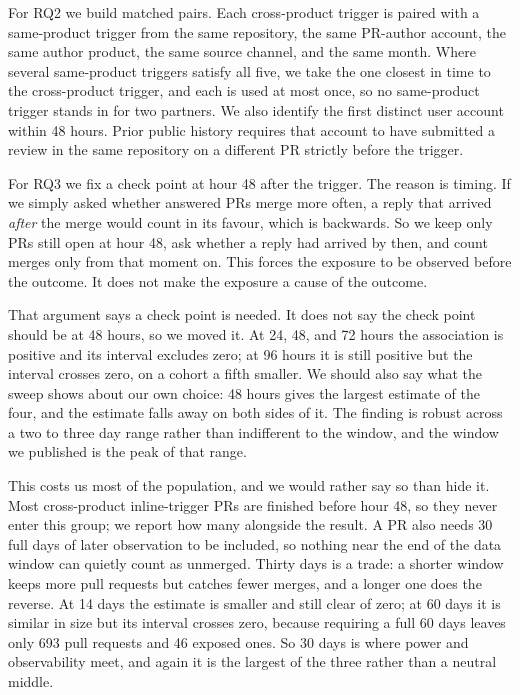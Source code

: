 \documentclass[lineno,pdflatex,sn-basic]{sn-jnl}
\begin{document}
For RQ2 we build matched pairs. Each cross-product trigger is paired with a
same-product trigger from the same repository, the same PR-author account, the
same author product, the same source channel, and the same month. Where several same-product triggers satisfy all
five, we take the one closest in time to the cross-product trigger, and each is
used at most once, so no same-product trigger stands in for two partners.
We also identify the first distinct user account within 48 hours. Prior public
history requires that account to have submitted a review in the same repository
on a different PR strictly before the trigger.

For RQ3 we fix a check point at hour 48 after the trigger. The reason is timing.
If we simply asked whether answered PRs merge more often, a reply that arrived
\emph{after} the merge would count in its favour, which is backwards. So we keep
only PRs still open at hour 48, ask whether a reply had arrived by then, and count
merges only from that moment on. This forces the exposure to be observed before the
outcome. It does not make the exposure a cause of the outcome.

That argument says a check point is needed. It does not say the check point
should be at 48 hours, so we moved it. At 24, 48, and 72 hours the association is
positive and its interval excludes zero; at 96 hours it is still positive but the
interval crosses zero, on a cohort a fifth smaller. We should also say what the
sweep shows about our own choice: 48 hours gives the largest estimate of the
four, and the estimate falls away on both sides of it. The finding is robust
across a two to three day range rather than indifferent to the window, and the
window we published is the peak of that range.

This costs us most of the population, and we would rather say so than hide it.
Most cross-product inline-trigger PRs are finished before hour 48, so they never
enter this group; we report how many alongside the result. A PR also needs 30 full
days of later observation to be included, so nothing near the end of the data
window can quietly count as unmerged. Thirty days is a trade: a shorter window
keeps more pull requests but catches fewer merges, and a longer one does the
reverse. At 14 days the estimate is smaller and still clear of zero; at 60 days
it is similar in size but its interval crosses zero, because requiring a full 60
days leaves only 693 pull requests and 46 exposed ones. So 30 days is where power
and observability meet, and again it is the largest of the three rather than a
neutral middle.
\end{document}
